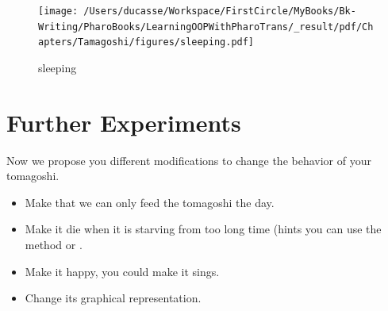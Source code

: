 \documentclass[10pt,twoside,english]{_support/latex/sbabook/sbabook}
\begin{document}
\begin{figure}

\begin{center}
\texttt{[image: /Users/ducasse/Workspace/FirstCircle/MyBooks/Bk-Writing/PharoBooks/LearningOOPWithPharoTrans/\_result/pdf/Chapters/Tamagoshi/figures/sleeping.pdf]}\caption{sleeping\label{sleeping}}\end{center}
\end{figure}

\section{Further Experiments}
Now we propose you different modifications to change the behavior of your tomagoshi. 

\begin{itemize}
\item Make that we can only feed the tomagoshi the day. 
\item Make it die when it is starving from too long time (hints you can use the method  or .
\item Make it happy, you could make it sings.
\item Change its graphical representation.  
\end{itemize}


\backmatter



\end{document}
